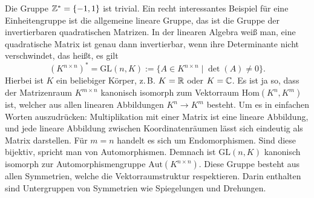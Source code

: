 Die Gruppe $\mathbb Z^* = \{-1,1\}$ ist trivial.
Ein recht interessantes Beispiel für eine Einheitengruppe ist die
allgemeine lineare Gruppe, das ist die Gruppe der invertierbaren
quadratischen Matrizen. In der linearen Algebra weiß man, eine
quadratische Matrix ist genau dann invertierbar, wenn ihre Determinante
nicht verschwindet, das heißt, es gilt%
\[(K^{n\times n})^* = \mathrm{GL}(n,K) :=
\{A\in K^{n\times n}\mid \det(A)\ne 0\}.\]
Hierbei ist $K$ ein beliebiger Körper, z.\,B. $K=\mathbb R$ oder $K=\mathbb C$.
Es ist ja so, dass der Matrizenraum $K^{m\times n}$ kanonisch
isomorph zum Vektorraum $\mathrm{Hom}(K^n,K^m)$ ist, welcher aus
allen linearen Abbildungen $K^n\to K^m$ besteht. Um es in einfachen
Worten auszudrücken: Multiplikation mit einer Matrix ist eine
lineare Abbildung, und jede lineare Abbildung zwischen Koordinatenräumen
lässt sich eindeutig als Matrix darstellen. Für $m=n$ handelt
es sich um Endomorphismen. Sind diese bijektiv, spricht man von
Automorphismen. Demnach ist $\mathrm{GL}(n,K)$ kanonisch isomorph
zur Automorphismengruppe $\mathrm{Aut}(K^{n\times n})$. Diese Gruppe
besteht aus allen Symmetrien, welche die Vektorraumstruktur
respektieren. Darin enthalten sind Untergruppen von Symmetrien wie
Spiegelungen und Drehungen.
